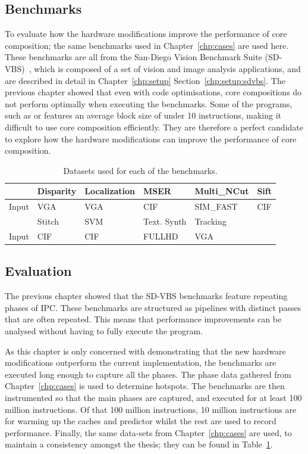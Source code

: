 \subsection{Benchmarks}
To evaluate how the hardware modifications improve the performance of core composition; the same benchmarks used in Chapter~\ref{chp:cases} are used here.
These benchmarks are all from the San-Diego Vision Benchmark Suite (SD-VBS)~\cite{sdvbs}, which is composed of a set of vision and image analysis applications, and are described in detail in Chapter~\ref{chp:setup} Section~\ref{chp:setup:sdvbs}.
The previous chapter showed that even with code optimisations, core compositions do not perform optimally when executing the benchmarks.
Some of the programs, such as  or  features an average block size of under 10 instructions, making it difficult to use core composition efficiently.
They are therefore a perfect candidate to explore how the hardware modifications can improve the performance of core composition.

\begin{table}[t]
  \smaller
  \centering
 \begin{tabular} {| l | l | l | l | l | l | }
 \hline
   & \cellcolor[gray]{0.7}Disparity & \cellcolor[gray]{0.7} Localization& \cellcolor[gray]{0.7} MSER& \cellcolor[gray]{0.7} Multi\_NCut& \cellcolor[gray]{0.7} Sift\\ \hline
Input&	VGA  & VGA & CIF  & SIM\_FAST& CIF\\ \hline
	
	 & \cellcolor[gray]{0.7} Stitch & \cellcolor[gray]{0.7} SVM & \cellcolor[gray]{0.7} Text. Synth & \cellcolor[gray]{0.7} Tracking&\\ \hline
	  Input & CIF& CIF& FULLHD& VGA &\\ \hline

	\end{tabular}
  \caption{Datasets used for each of the benchmarks.}\label{tab:sd-data2}
\end{table}
\subsection{Evaluation} 
The previous chapter showed that the SD-VBS benchmarks feature repeating phases of IPC.
These benchmarks are structured as pipelines with distinct passes that are often repeated.
This means that performance improvements can be analysed without having to fully execute the program.

As this chapter is only concerned with demonstrating that the new hardware modifications outperform the current implementation, the benchmarks are executed long enough to capture all the phases.
The phase data gathered from Chapter~\ref{chp:cases} is used to determine hotspots.
The benchmarks are then instrumented so that the main phases are captured, and executed for at least 100 million instructions.
Of that 100 million instructions, 10 million instructions are for warming up the caches and predictor whilst the rest are used to record performance.
Finally, the same data-sets from Chapter~\ref{chp:cases} are used, to maintain a consistency amongst the thesis; they can be found in Table~\ref{tab:sd-data2}.

